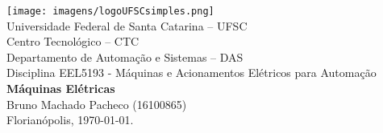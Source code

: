 \documentclass[a4paper,11pt]{article}
\begin{document}
	\thispagestyle{empty}
\begin{center}
	\texttt{[image: imagens/logoUFSCsimples.png]} \\
	{\Large Universidade Federal de Santa Catarina -- UFSC} \\
	{\Large Centro Tecnológico -- CTC} \\
	{\Large Departamento de Automação e Sistemas -- DAS} \\
	\vspace{1cm}
	{\large Disciplina EEL5193 - Máquinas e Acionamentos Elétricos para Automação} \\
	\vfill
	\large{\textbf{Máquinas Elétricas} \\
	} 
	\vspace{1cm}
    Bruno Machado Pacheco (16100865) \\
    \vfill
	Florianópolis, \today.
\end{center}

\clearpage

\tableofcontents

\clearpage



\newpage


\newpage


\newpage


\newpage


\newpage


\newpage
\end{document}
